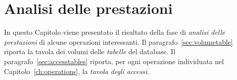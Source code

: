 \chapter{Analisi delle prestazioni}
In questo Capitolo viene presentato il risultato della fase di {\it analisi delle prestazioni} di
alcune operazioni interessanti. Il paragrafo~\vref{sec:volumetable} riporta la tavola dei
volumi delle {\it tabelle} del database. Il paragrafo~\vref{sec:accesstables} riporta, per ogni
operazione individuata nel Capitolo~\vref{ch:operations}, la {\it tavola degli accessi}.


